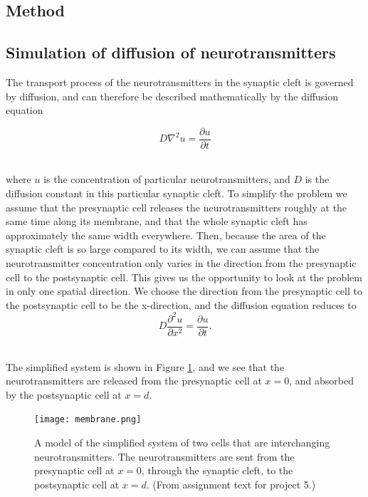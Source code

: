 \documentclass[12pt]{article}
\begin{document}
\begin{flushleft}
\section{Method}
\subsection{Simulation of diffusion of neurotransmitters}
The transport process of the neurotransmitters in the synaptic cleft is governed by diffusion, and can therefore be described mathematically by the diffusion equation

\vspace{5mm}
$$D\nabla^2u = \frac{\partial u}{\partial t}$$\\
\vspace{5mm}

where $u$ is the concentration of particular neurotransmitters, and $D$ is the diffusion constant in this particular synaptic cleft. To simplify the problem we assume that the presynaptic cell releases the neurotransmitters roughly at the same time along its membrane, and that the whole synaptic cleft has approximately the same width everywhere. Then, because the area of the synaptic cleft is so large compared to its width, we can assume that the neurotransmitter concentration only varies in the direction from the presynaptic cell to the postsynaptic cell. This gives us the opportunity to look at the problem in only one spatial direction. We choose the direction from the presynaptic cell to the postsynaptic cell to be the x-direction, and the diffusion equation reduces to
\begin{equation}\label{eq:diffusion_equation}
D\frac{\partial^2 u}{\partial x^2} = \frac{\partial u}{\partial t}.
\end{equation}\\
\vspace{5mm}

The simplified system is shown in Figure \ref{fig:cleft_model}, and we see that the neurotransmitters are released from the presynaptic cell at $x=0$, and absorbed by the postsynaptic cell at $x = d$.

\begin{figure}[!h]
\begin{center}
\texttt{[image: membrane.png]}
\caption{\label{fig:cleft_model}A model of the simplified system of two cells that are interchanging neurotransmitters. The neurotransmitters are sent from the presynaptic cell at $x=0$, through the synaptic cleft, to the postsynaptic cell at $x=d$. (From assignment text for project 5.)}
\end{center}
\end{figure}


\end{flushleft}
\end{document}

